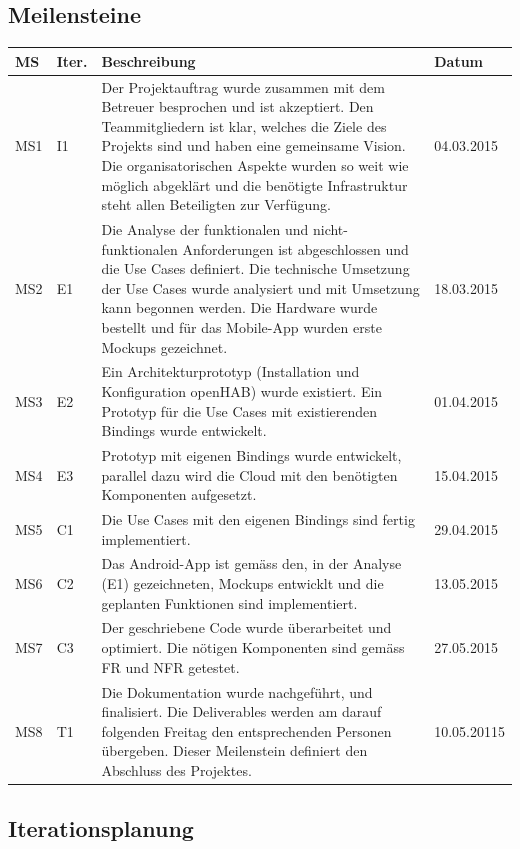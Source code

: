 \subsection*{Meilensteine}
\begin{tabularx}{\textwidth}{lp{1cm}Xl}
	\textbf{MS}	& \textbf{Iter.} & \textbf{Beschreibung} & \textbf{Datum} \\ \hline
	MS1	& I1 & Der Projektauftrag wurde zusammen mit dem Betreuer besprochen und ist akzeptiert. Den Teammitgliedern ist klar, welches die Ziele des Projekts sind und haben eine gemeinsame Vision. Die organisatorischen Aspekte wurden so weit wie möglich abgeklärt und die benötigte Infrastruktur steht allen Beteiligten zur Verfügung.	& 04.03.2015 \\ \hline
	MS2 & E1 & Die Analyse der funktionalen und nicht-funktionalen Anforderungen ist abgeschlossen und die Use Cases definiert. Die technische Umsetzung der Use Cases wurde analysiert und mit Umsetzung kann begonnen werden. Die Hardware wurde bestellt und für das Mobile-App wurden erste Mockups gezeichnet.	& 18.03.2015 \\ \hline
	MS3 & E2 & Ein Architekturprototyp (Installation und Konfiguration openHAB) wurde existiert. Ein Prototyp für die Use Cases mit existierenden Bindings wurde entwickelt.	& 01.04.2015 \\ \hline
	MS4 & E3 & Prototyp mit eigenen Bindings wurde entwickelt, parallel dazu wird die Cloud mit den benötigten Komponenten aufgesetzt.	& 15.04.2015 \\ \hline
 	MS5 & C1 & Die Use Cases mit den eigenen Bindings sind fertig implementiert. & 29.04.2015 \\ \hline
	MS6	& C2 & Das Android-App ist gemäss den, in der Analyse (E1) gezeichneten, Mockups entwicklt und die geplanten Funktionen sind implementiert. & 13.05.2015 \\ \hline 
 	MS7 & C3 & Der geschriebene Code wurde überarbeitet und optimiert. Die nötigen Komponenten sind gemäss FR und NFR getestet. & 27.05.2015 \\ \hline
	MS8 & T1 & Die Dokumentation wurde nachgeführt, und finalisiert. Die Deliverables werden am darauf folgenden Freitag den entsprechenden Personen übergeben. Dieser Meilenstein definiert den Abschluss des Projektes. & 10.05.20115 \\ \hline
\end{tabularx}

\subsection*{Iterationsplanung}
\tbd


